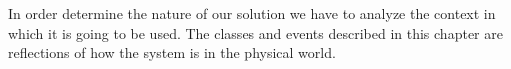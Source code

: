 In order determine the nature of our solution we have to analyze the context in which it is going to be used. The classes and events described in this chapter are reflections of how the system is in the physical world. 





